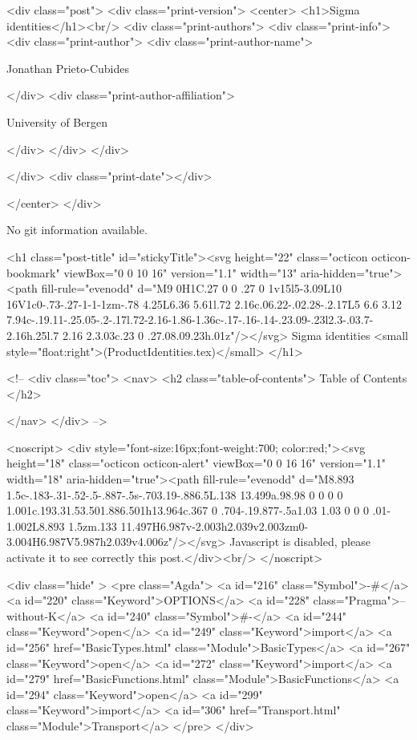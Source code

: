 <div class="post">
  <div class="print-version">
    <center>
      <h1>Sigma identities</h1><br/>
        <div class="print-authors">
          <div class="print-info">
            <div class="print-author">
              <div class="print-author-name">
                
                  Jonathan Prieto-Cubides
                
              </div>
              <div class="print-author-affiliation">
                
                  University of Bergen
                
                </div>
            </div>
          </div>
          
          
        </div>
        <div class="print-date"></div>
        
        
    </center>
  </div>

  
  No git information available.
  

  <h1 class="post-title" id="stickyTitle"><svg height="22" class="octicon octicon-bookmark" viewBox="0 0 10 16" version="1.1" width="13" aria-hidden="true"><path fill-rule="evenodd" d="M9 0H1C.27 0 0 .27 0 1v15l5-3.09L10 16V1c0-.73-.27-1-1-1zm-.78 4.25L6.36 5.61l.72 2.16c.06.22-.02.28-.2.17L5 6.6 3.12 7.94c-.19.11-.25.05-.2-.17l.72-2.16-1.86-1.36c-.17-.16-.14-.23.09-.23l2.3-.03.7-2.16h.25l.7 2.16 2.3.03c.23 0 .27.08.09.23h.01z"/></svg> Sigma identities <small style="float:right">(ProductIdentities.tex)</small>
  </h1>

  <!-- 
  <div class="toc">
    <nav>
    <h2 class="table-of-contents"> Table of Contents </h2>
      

    </nav>
  </div>
   -->

  <noscript>
  <div style="font-size:16px;font-weight:700; color:red;"><svg height="18" class="octicon octicon-alert" viewBox="0 0 16 16" version="1.1" width="18" aria-hidden="true"><path fill-rule="evenodd" d="M8.893 1.5c-.183-.31-.52-.5-.887-.5s-.703.19-.886.5L.138 13.499a.98.98 0 0 0 0 1.001c.193.31.53.501.886.501h13.964c.367 0 .704-.19.877-.5a1.03 1.03 0 0 0 .01-1.002L8.893 1.5zm.133 11.497H6.987v-2.003h2.039v2.003zm0-3.004H6.987V5.987h2.039v4.006z"/></svg> Javascript is disabled, please activate it to see correctly this post.</div><br/>
  </noscript>

  <div class="hide" >
<pre class="Agda">
<a id="216" class="Symbol">{-#</a> <a id="220" class="Keyword">OPTIONS</a> <a id="228" class="Pragma">--without-K</a> <a id="240" class="Symbol">#-}</a>
<a id="244" class="Keyword">open</a> <a id="249" class="Keyword">import</a> <a id="256" href="BasicTypes.html" class="Module">BasicTypes</a>
<a id="267" class="Keyword">open</a> <a id="272" class="Keyword">import</a> <a id="279" href="BasicFunctions.html" class="Module">BasicFunctions</a>
<a id="294" class="Keyword">open</a> <a id="299" class="Keyword">import</a> <a id="306" href="Transport.html" class="Module">Transport</a>
</pre>
</div>

